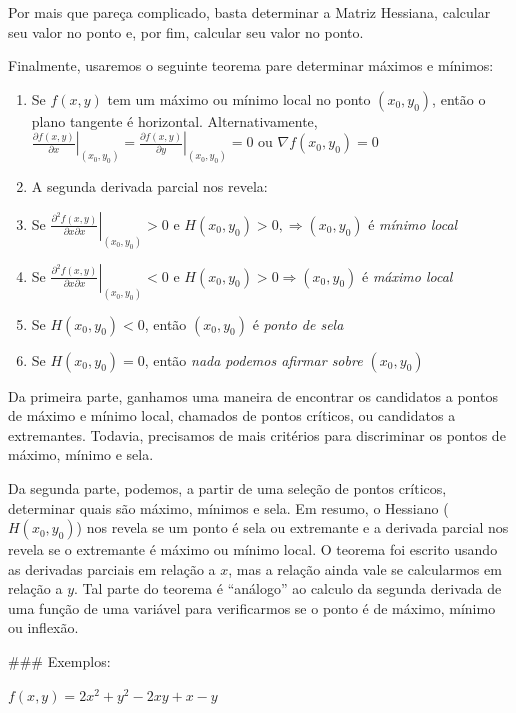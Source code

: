 \documentclass[
  letterpaper,
  DIV=11,
  numbers=noendperiod]{scrreprt}
\providecommand{\tightlist}{%
  \setlength{\itemsep}{0pt}\setlength{\parskip}{0pt}}\usepackage{longtable,booktabs,array}
\begin{document}
Por mais que pareça complicado, basta determinar a Matriz Hessiana,
calcular seu valor no ponto e, por fim, calcular seu valor no ponto.

Finalmente, usaremos o seguinte teorema pare determinar máximos e
mínimos:

\begin{enumerate}
\def\labelenumi{\arabic{enumi}.}
\tightlist
\item
  Se \(f(x,y)\) tem um máximo ou mínimo local no ponto \((x_0, y_0)\),
  então o plano tangente é horizontal. Alternativamente,
  \(\left. \frac{\partial f(x,y)}{\partial x} \right\rvert_{(x_0,y_0)} = \left. \frac{\partial f(x,y)}{\partial y} \right|_{(x_0,y_0)} = 0 \text{ ou } \nabla f(x_0,y_0)=0\)
\item
  A segunda derivada parcial nos revela:
\item
  Se
  \(\left. \frac{\partial^2 f(x,y)}{\partial x \partial x} \right\rvert_{(x_0,y_0)}>0 \text{ e } H(x_0,y_0)>0, \Rightarrow (x_0,y_0)\)
  é \emph{mínimo local}
\item
  Se
  \(\left. \frac{\partial^2 f(x,y)}{\partial x \partial x} \right\rvert_{(x_0,y_0)}<0 \text{ e } H(x_0,y_0)>0 \Rightarrow (x_0,y_0)\)
  é \emph{máximo local}
\item
  Se \(H(x_0,y_0)<0\), então \((x_0,y_0)\) é \emph{ponto de sela}
\item
  Se \(H(x_0,y_0)=0\), então \emph{nada podemos afirmar sobre
  \((x_0,y_0)\)}
\end{enumerate}

Da primeira parte, ganhamos uma maneira de encontrar os candidatos a
pontos de máximo e mínimo local, chamados de pontos críticos, ou
candidatos a extremantes. Todavia, precisamos de mais critérios para
discriminar os pontos de máximo, mínimo e sela.

Da segunda parte, podemos, a partir de uma seleção de pontos críticos,
determinar quais são máximo, mínimos e sela. Em resumo, o Hessiano
(\(H(x_0, y_0)\)) nos revela se um ponto é sela ou extremante e a
derivada parcial nos revela se o extremante é máximo ou mínimo local. O
teorema foi escrito usando as derivadas parciais em relação a \(x\), mas
a relação ainda vale se calcularmos em relação a \(y\). Tal parte do
teorema é ``análogo'' ao calculo da segunda derivada de uma função de
uma variável para verificarmos se o ponto é de máximo, mínimo ou
inflexão.

\#\#\# Exemplos:

\(f(x,y)=2x^2 + y^2 − 2xy + x − y\)
\end{document}
